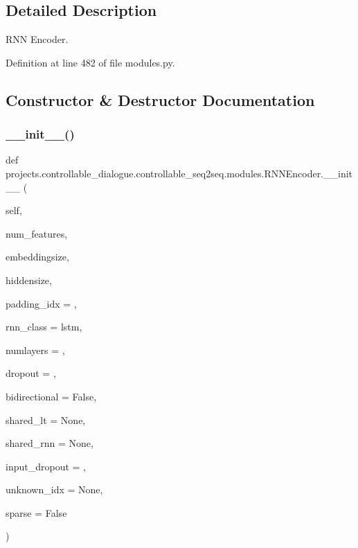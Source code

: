 \subsection{Detailed Description}
\begin{DoxyVerb}RNN Encoder.
\end{DoxyVerb}
 

Definition at line 482 of file modules.\+py.



\subsection{Constructor \& Destructor Documentation}
\mbox{\label{classprojects_1_1controllable__dialogue_1_1controllable__seq2seq_1_1modules_1_1RNNEncoder_a7b8489adad0cd4001a02a55caf861295}} 
\subsubsection{\texorpdfstring{\+\_\+\+\_\+init\+\_\+\+\_\+()}{\_\_init\_\_()}}
{\footnotesize\ttfamily def projects.\+controllable\+\_\+dialogue.\+controllable\+\_\+seq2seq.\+modules.\+R\+N\+N\+Encoder.\+\_\+\+\_\+init\+\_\+\+\_\+ (\begin{DoxyParamCaption}\item[{}]{self,  }\item[{}]{num\+\_\+features,  }\item[{}]{embeddingsize,  }\item[{}]{hiddensize,  }\item[{}]{padding\+\_\+idx = {},  }\item[{}]{rnn\+\_\+class = {\ttfamily \textquotesingle{}lstm\textquotesingle{}},  }\item[{}]{numlayers = {},  }\item[{}]{dropout = {},  }\item[{}]{bidirectional = {\ttfamily False},  }\item[{}]{shared\+\_\+lt = {\ttfamily None},  }\item[{}]{shared\+\_\+rnn = {\ttfamily None},  }\item[{}]{input\+\_\+dropout = {},  }\item[{}]{unknown\+\_\+idx = {\ttfamily None},  }\item[{}]{sparse = {\ttfamily False} }\end{DoxyParamCaption})}

